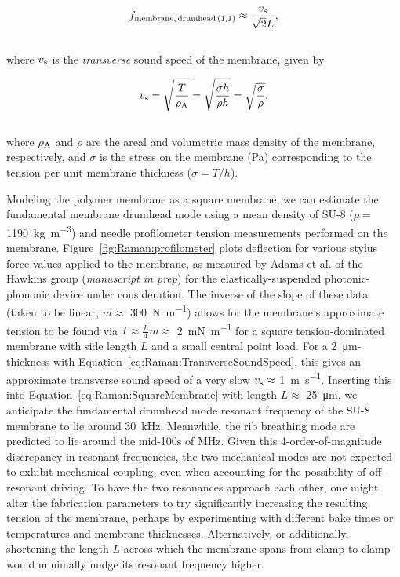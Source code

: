 \begin{equation}
  f_{\rm membrane,\,drumhead\,(1,1)} \approx \frac{v_{\rm s}}{\sqrt{2}L},
  \label{eq:Raman:SquareMembrane}
\end{equation}
\\
where \(v_{\rm s}\) is the \emph{transverse} sound speed of the membrane, given by

\begin{equation}
  v_{\rm s} = \sqrt{\frac{T}{\rho_{\rm A}}} = \sqrt{\frac{\sigma h}{\rho h}} = \sqrt{\frac{\sigma}{\rho}},
  \label{eq:Raman:TransverseSoundSpeed}
\end{equation}
\\
where \(\rho_{\rm A}\) and \(\rho\) are the areal and volumetric mass density of the membrane, respectively, and \(\sigma\) is the stress on the membrane (\si{\pascal}) corresponding to the tension per unit membrane thickness (\(\sigma = T/h\)).

Modeling the polymer membrane as a square membrane, we can estimate the fundamental membrane drumhead mode using a mean density of SU-8 (\(\rho =\) \SI{1190}{\kilo\gram\per\cubic\meter}) \cite{roch2003fabrication} and needle profilometer tension measurements performed on the membrane. Figure~\ref{fig:Raman:profilometer} plots deflection for various stylus force values applied to the membrane, as measured by Adams et al. of the Hawkins group (\textit{manuscript in prep}) for the elastically-suspended photonic-phononic device under consideration. The inverse of the slope of these data (taken to be linear, \(m \approx\) \SI{300}{\newton\per\meter}) allows for the membrane's approximate tension to be found via \(T \approx \frac{L}{4}m \approx\) \SI{2}{\milli\newton\per\meter} for a square tension-dominated membrane with side length \(L\) and a small central point load. \cite{blevins1980formulas, timoshenko1959theory} For a \SI{2}{\micro\meter}-thickness with Equation~\ref{eq:Raman:TransverseSoundSpeed}, this gives an approximate transverse sound speed of a very slow \(v_{\rm s} \approx\) \SI{1}{\meter\per\second}. Inserting this into Equation~\ref{eq:Raman:SquareMembrane} with length \(L\approx\) \SI{25}{\micro\meter}, we anticipate the fundamental drumhead mode resonant frequency of the SU-8 membrane to lie around \SI{30}{\kilo\hertz}. Meanwhile, the rib breathing mode are predicted to lie around the mid-100s of \si{\mega\hertz}. Given this 4-order-of-magnitude discrepancy in resonant frequencies, the two mechanical modes are not expected to exhibit mechanical coupling, even when accounting for the possibility of off-resonant driving. To have the two resonances approach each other, one might alter the fabrication parameters to try significantly increasing the resulting tension of the membrane, perhaps by experimenting with different bake times or temperatures and membrane thicknesses. Alternatively, or additionally, shortening the length \(L\) across which the membrane spans from clamp-to-clamp would minimally nudge its resonant frequency higher.

